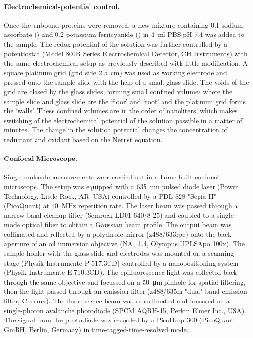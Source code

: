 \paragraph*{Electrochemical-potential control.}
Once the unbound proteins were removed, a new mixture containing \SI{0.1}{\mM} sodium ascorbate () and \SI{0.2}{\mM} potassium ferricyanide (\ce{[Fe(CN)6^3-]}) in \SI{4}{\ml} PBS pH 7.4 was added to the sample.
The redox potential of the solution was further controlled by a potentiostat (Model 800B Series Electrochemical Detector, CH Instruments) with the same electrochemical setup as previously described\cite{zhang2017gold} with little modification.
A square platinum grid (grid side \SI{2.5}{\cm}) was used as working electrode and pressed onto the sample slide with the help of a small glass slide.
The voids of the grid are closed by the glass slides, forming small confined volumes where the sample slide and glass slide are the `floor' and `roof' and the platinum grid forms the `walls'.
These confined volumes are in the order of nanoliters, which makes switching of the electrochemical potential of the solution possible in a matter of minutes.
The change in the solution potential changes the concentration of reductant and oxidant based on the Nernst equation.

\paragraph*{Confocal Microscope.}
Single-molecule measurements were carried out in a home-built confocal microscope.
The setup was equipped with a \SI{635}{\nm} pulsed diode laser (Power Technology, Little Rock, AR, USA) controlled by a PDL 828 "Sepia II" (PicoQuant) at \SI{40}{\MHz} repetition rate.
The laser beam was passed through a narrow-band cleanup filter (Semrock LD01-640/8-25) and coupled to a single-mode optical fiber to obtain a Gaussian beam profile.
The output beam was collimated and reflected by a polychroic mirror (z488/633rpc) onto the back aperture of an oil immersion objective (NA=1.4, Olympus UPLSApo 100x).
The sample holder with the glass slide and electrodes was mounted on a scanning stage (Physik Instrumente P-517.3CD) controlled by a nanopositioning system (Physik Instrumente E-710.3CD). 
The epifluorescence light was collected back through the same objective and focussed on a \SI{50}{\um} pinhole for spatial filtering, then the light passed through an emission filter (z488/635m "dual"-band emission filter, Chroma). 
The fluorescence beam was re-collimated and focussed on a single-photon avalanche photodiode (SPCM AQRH-15, Perkin Elmer Inc., USA).
The signal from the photodiode was recorded by a PicoHarp 300 (PicoQuant GmBH, Berlin, Germany) in time-tagged-time-resolved mode.

